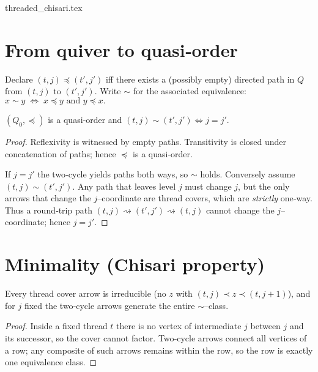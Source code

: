 \begin{filecontents*}{threaded_chisari.tex}
    \section{From quiver to quasi‑order}
    
    \begin{definition}\label{def:preorder}
    Declare $(t,j)\preccurlyeq(t',j')$ iff
    there exists a (possibly empty) directed path in $Q$  
    from $(t,j)$ to $(t',j')$.  
    Write $\sim$ for the associated equivalence:
    \(
      x\sim y \;\Leftrightarrow\; x\preccurlyeq y \text{ and } y\preccurlyeq x.
    \)
    \end{definition}
    
    \begin{proposition}\label{prop:preorder}
    $(Q_0,\preccurlyeq)$ is a quasi‑order and 
    \(
      (t,j)\sim(t',j') \Longleftrightarrow j=j'.
    \)
    \end{proposition}
    
    \begin{proof}
    Reflexivity is witnessed by empty paths.
    Transitivity is closed under concatenation of paths; hence $\preccurlyeq$ is a quasi‑order.
    
    If $j=j'$ the two‑cycle yields paths both ways, so $\sim$ holds.
    Conversely assume $(t,j)\sim(t',j')$.  
    Any path that leaves level $j$ must change $j$, but the only arrows that
    change the $j$–coordinate are thread covers, which are \emph{strictly} one‑way.
    Thus a round‑trip path $(t,j)\rightsquigarrow(t',j')\rightsquigarrow(t,j)$ 
    cannot change the $j$–coordinate; hence $j=j'$.
    \end{proof}
    
    \section{Minimality (Chisari property)}
    
    \begin{lemma}\label{lem:irreducible}
    Every thread cover arrow is irreducible 
    (no $z$ with $(t,j)\prec z\prec (t,j+1)$),
    and for $j$ fixed the two‑cycle arrows generate the entire $\sim$–class.
    \end{lemma}
    
    \begin{proof}
    Inside a fixed thread $t$ there is no vertex of
    intermediate $j$ between $j$ and its successor, so the cover cannot factor.
    Two‑cycle arrows connect all vertices of a row;
    any composite of such arrows remains within the row, 
    so the row is exactly one equivalence class.
    \end{proof}
    

\end{filecontents*}
